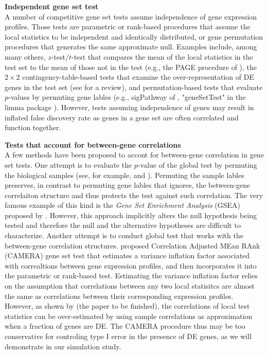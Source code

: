 \documentclass[11pt, a4paper]{article}
\begin{document}
	\textbf{Independent gene set test} \\
	 A number of competitive gene set tests assume independence of gene expression profiles. Those tests are parametric or rank-based procedures that assume the local statistics to be independent and identically distributed, or gene permutation procedures that generates the same approximate null. Examples include, among many others, $z$-test/$t$-test that compares the mean of the local statistics in the test set to the mean of those not in the test (e.g., the PAGE procedure of \citealp{kim2005page}), the $2\times 2$ contingency-table-based tests that examine the over-representation of DE genes in the test set (see \citealp{huang2009bioinformatics} for a review), and permutation-based tests that evaluate $p$-values by permuting gene lables (e.g., sigPathway of \citealp{tian2005discovering}, "geneSetTest" in the limma package \citealp{Smyth2004moderated}). However, tests assuming independence of genes may result in inflated false discovery rate \citep{efron2007testing}
	 as genes in a gene set are often correlated and function together.
	 
	  \textbf{Tests that account for between-gene correlations}\\

	  A few methods have been proposed to accont for between-gene correlation in gene set tests. One attempt is to evaluate the $p$-value of the global test by permuting the biological samples (see, for example, \citealp{subramanian2005gene} and \citealp{efron2007testing}). Permuting the sample lables preserves, in contrast to permuting gene lables that ignores, the between-gene correlaiton structure and thus protects the test against such correlation. The very famous example of this kind is the \textit{Gene Set Enrichment Analysis }(GSEA) proposed by \cite{subramanian2005gene}.  However, this approach implicitly alters the null hypothesis being tested and therefore the null and the alternative hypotheses are difficult to characterize. Another attempt is to conduct global test that works with the between-gene correlation structures. \cite{wu2012camera} proposed Correlation Adjusted MEan RAnk (CAMERA) gene set test that estimates a variance inflation factor associated with correaltions between gene expression profiles, and then incorporates it into the parametric or rank-based test. Estimating the variance inflation factor relies on the assumption that correlations between any two local statisitcs are almost the same as correlations between their corresponding expression profiles. However, as shown by (the paper to be finished), the correlations of local test statistics can be over-estimated by using sample correlations as approximation when a fraction of genes are DE. The CAMERA procedure thus may be too conservative for controling type I error in the presence of DE genes, as we will demonstrate in our simulation study. 
\end{document}
